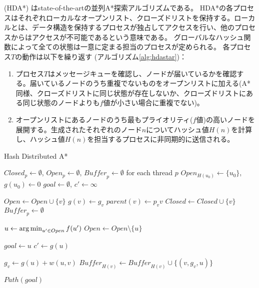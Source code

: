  (HDA*) \cite{kishimotofb13}はstate-of-the-artの並列A*探索アルゴリズムである。
HDA*の各プロセスはそれぞれローカルなオープンリスト、クローズドリストを保持する。ローカルとは、データ構造を保持するプロセスが独占してアクセスを行い、他のプロセスからはアクセスが不可能であるという意味である。
グローバルなハッシュ関数によって全ての状態は一意に定まる担当のプロセスが定められる。
各プロセス$T$の動作は以下を繰り返す (アルゴリズム\ref{alg:hdastar})：

\begin{enumerate}
	\item 
		プロセス$T$はメッセージキューを確認し、ノードが届いているかを確認する。届いているノードのうち重複でないものをオープンリストに加える(A*同様、クローズドリストに同じ状態が存在しないか、クローズドリストにある同じ状態のノードよりも$f$値が小さい場合に重複でない)。
	\item 
		オープンリストにあるノードのうち最もプライオリティ($f$値)の高いノードを展開する。生成されたそれぞれのノード$n$についてハッシュ値$H(n)$を計算し、ハッシュ値$H(n)$を担当するプロセスに非同期的に送信される。
\end{enumerate}


\begin{algorithm}
  \caption{Hash Distributed A*}
  $Closed_p \leftarrow \emptyset$, $Open_p \leftarrow \emptyset$, $\mathit{Buffer}_p \leftarrow \emptyset$ for each thread $p$\;
  $Open_{H(u_0)} \leftarrow \{u_0\}$, $g(u_0) \leftarrow 0$\;
  $goal \leftarrow \emptyset$, $c' \leftarrow \infty$\;

   {
   {
     {
       {
        $Open \leftarrow Open \cup \{v\}$\;
	$g(v) \leftarrow g_v$\;
        $parent(v) \leftarrow p_vv$\;
      }
       {
        $Closed \leftarrow Closed \cup \{v\}$\;
      }
    }
    $\mathit{Buffer}_p \leftarrow \emptyset$\;
     {
      $u \leftarrow \operatorname*{arg\,min}_{u' \in Open} f(u')$ \;
      $Open \leftarrow Open \setminus \{u\} $\;

       {
        $goal \leftarrow u$\;
        $c' \leftarrow g(u)$\;        
      }

       {
        $g_v \leftarrow g(u) + w(u, v)$\;
        $\mathit{Buffer}_{H(v)} \leftarrow \mathit{Buffer}_{H(v)} \cup \{(v, g_v, u)\}$\;
      }
    }
  }
  \Return $Path(goal)$\;
  }
  \label{alg:hdastar}
\end{algorithm}

